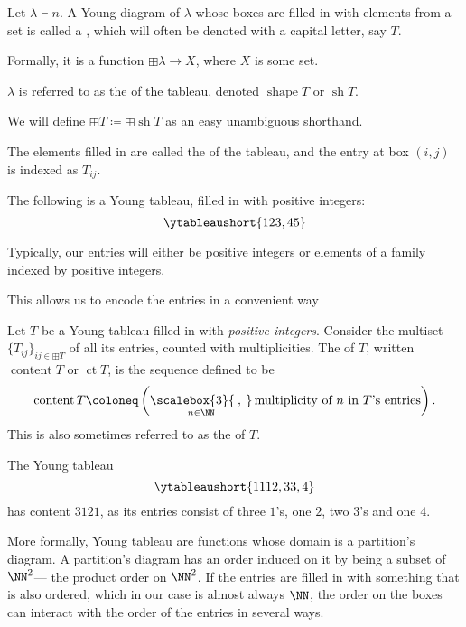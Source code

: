 \documentclass{article}
\newcommand{\bigcomma}{\ensuremath{\mathop{\scalebox{3}{\:,\:}}\limits}}
\DeclareMathOperator{\shape}{shape}
\DeclareMathOperator{\sh}{sh}
\DeclareMathOperator{\content}{content}
\DeclareMathOperator{\ct}{ct}
\begin{document}
\begin{definition}
    Let $\lambda \vdash n$. A Young diagram of $\lambda$ whose boxes are filled in with elements from a set is called a , which will often be denoted with a capital letter, say $T$. 

    Formally, it is a function $\boxplus \lambda \to X$, where $X$ is some set.

    $\lambda$ is referred to as the  of the tableau, denoted $\shape T$ or $\sh T$.

    We will define $\boxplus T \coloneq \boxplus \sh T$ as an easy unambiguous shorthand.

    The elements filled in are called the  of the tableau, and the entry at box $(i,j)$ is indexed as $T_{ij}$.
\end{definition}

\begin{example}
    The following is a Young tableau, filled in with positive integers:
    \[
        \ytableaushort{123,45}
    \]
\end{example}

Typically, our entries will either be positive integers or elements of a family indexed by positive integers.

This allows us to encode the entries in a convenient way

\begin{definition}
    Let $T$ be a Young tableau filled in with \textit{positive integers}.
    Consider the multiset $\{T_{ij}\}_{ij \in \boxplus T}$ of all its entries, counted with multiplicities.
    The  of $T$, written $\content T$ or $\ct T$, is the sequence defined to be
    \[
        \content T
        \coloneq
        \left(
            \bigcomma_{n \in \NN}
            \text{multiplicity of }n\text{ in }T\text{'s entries}
        \right).
    \]
    This is also sometimes referred to as the  of $T$.
\end{definition}

\begin{example}
    The Young tableau
    \[
        \ytableaushort{1112,33,4}
    \]
    has content $3121$, as its entries consist of three $1$'s, one $2$, two $3$'s and one $4$.
\end{example}

More formally, Young tableau are functions whose domain is a partition's diagram.
A partition's diagram has an order induced on it by being a subset of $\NN^2$--- the product order on $\NN^2$.
If the entries are filled in with something that is also ordered, which in our case is almost always $\NN$, the order on the boxes can interact with the order of the entries in several ways.
\end{document}
